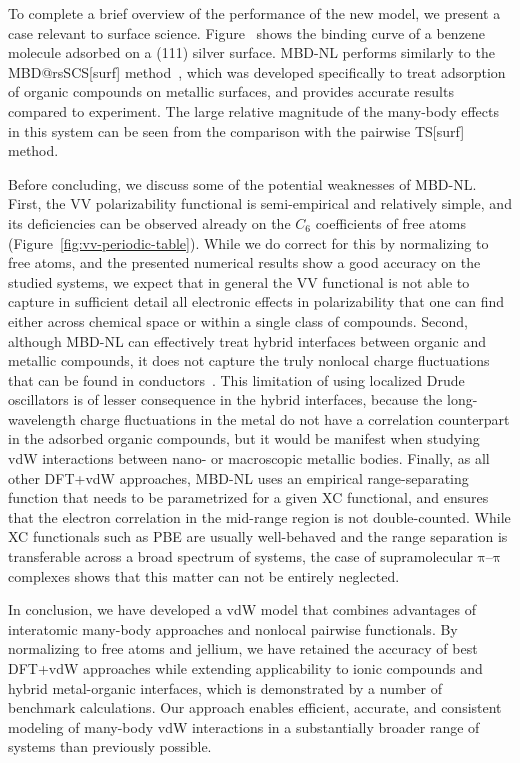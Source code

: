 To complete a brief overview of the performance of the new model, we present a case relevant to surface science.
Figure~\label{fig:silver-benzene} shows the binding curve of a benzene molecule adsorbed on a (111) silver surface.
MBD-NL performs similarly to the MBD@rsSCS[surf] method~\citep{RuizPRB16}, which was developed specifically to treat adsorption of organic compounds on metallic surfaces, and provides accurate results compared to experiment.
The large relative magnitude of the many-body effects in this system can be seen from the comparison with the pairwise TS[surf] method.


Before concluding, we discuss some of the potential weaknesses of MBD-NL\@.
First, the VV polarizability functional is semi-empirical and relatively simple, and its deficiencies can be observed already on the $C_6$ coefficients of free atoms (Figure~\ref{fig:vv-periodic-table}).
While we do correct for this by normalizing to free atoms, and the presented numerical results show a good accuracy on the studied systems, we expect that in general the VV functional is not able to capture in sufficient detail all electronic effects in polarizability that one can find either across chemical space or within a single class of compounds.
Second, although MBD-NL can effectively treat hybrid interfaces between organic and metallic compounds, it does not capture the truly nonlocal charge fluctuations that can be found in conductors~\cite{DobsonIJQC14}.
This limitation of using localized Drude oscillators is of lesser consequence in the hybrid interfaces, because the long-wavelength charge fluctuations in the metal do not have a correlation counterpart in the adsorbed organic compounds, but it would be manifest when studying vdW interactions between nano- or macroscopic metallic bodies.
Finally, as all other DFT+vdW approaches, MBD-NL uses an empirical range-separating function that needs to be parametrized for a given XC functional, and ensures that the electron correlation in the mid-range region is not double-counted.
While XC functionals such as PBE are usually well-behaved and the range separation is transferable across a broad spectrum of systems, the case of supramolecular $\mathrm\pi$--$\mathrm\pi$ complexes shows that this matter can not be entirely neglected.

In conclusion, we have developed a vdW model that combines advantages of interatomic many-body approaches and nonlocal pairwise functionals.
By normalizing to free atoms and jellium, we have retained the accuracy of best DFT+vdW approaches while extending applicability to ionic compounds and hybrid metal-organic interfaces, which is demonstrated by a number of benchmark calculations.
Our approach enables efficient, accurate, and consistent modeling of many-body vdW interactions in a substantially broader range of systems than previously possible.
